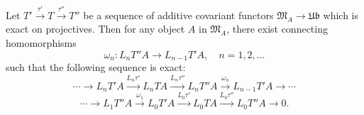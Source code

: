 Let $T' \xrightarrow{\tau'} T \xrightarrow{\tau''} T''$ be a sequence of additive covariant functors $\mathfrak{M}_A \rightarrow \mathfrak{Ub}$ which is exact on projectives. Then for any object $A$ in $\mathfrak{M}_A$, there exist connecting homomorphisms
$$\omega_n: L_n T'' A \rightarrow L_{n-1} T' A, \quad n = 1, 2, \ldots$$
such that the following sequence is exact:
$$\cdots \rightarrow L_n T' A \xrightarrow{L_n \tau'} L_n T A \xrightarrow{L_n \tau''} L_n T'' A \xrightarrow{\omega_n} L_{n-1} T' A \rightarrow \cdots$$
$$\cdots \rightarrow L_1 T'' A \xrightarrow{\omega_1} L_0 T' A \xrightarrow{L_0 \tau'} L_0 T A \xrightarrow{L_0 \tau''} L_0 T'' A \rightarrow 0.$$
